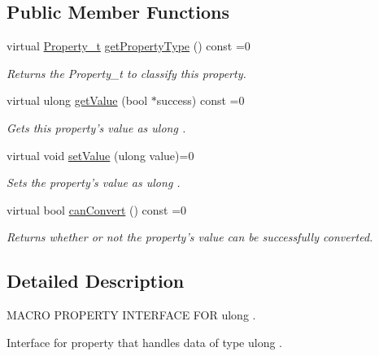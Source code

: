 \subsection*{Public Member Functions}
\begin{DoxyCompactItemize}
\item 
virtual \hyperlink{group___property_classes_ga38f1ccddda12c7cb50b868c9f789ee37}{Property\-\_\-t} \hyperlink{class_i_u_long_property_afcabc7c115954f9619eb2d519de1c83e}{get\-Property\-Type} () const =0
\begin{DoxyCompactList}\small\item\em Returns the Property\-\_\-t to classify this property. \end{DoxyCompactList}\item 
virtual ulong \hyperlink{class_i_u_long_property_a620e0d9b7260d93ee9e5a55c5c648f92}{get\-Value} (bool $\ast$success) const =0
\begin{DoxyCompactList}\small\item\em Gets this property's value as ulong . \end{DoxyCompactList}\item 
virtual void \hyperlink{class_i_u_long_property_a1a2b16105cd6cebdd7284ad6a631bfc4}{set\-Value} (ulong value)=0
\begin{DoxyCompactList}\small\item\em Sets the property's value as ulong . \end{DoxyCompactList}\item 
virtual bool \hyperlink{class_i_u_long_property_ad63c658df7494298fd8a0ab41623a184}{can\-Convert} () const =0
\begin{DoxyCompactList}\small\item\em Returns whether or not the property's value can be successfully converted. \end{DoxyCompactList}\end{DoxyCompactItemize}


\subsection{Detailed Description}
M\-A\-C\-R\-O P\-R\-O\-P\-E\-R\-T\-Y I\-N\-T\-E\-R\-F\-A\-C\-E F\-O\-R ulong . 

Interface for property that handles data of type ulong . 

